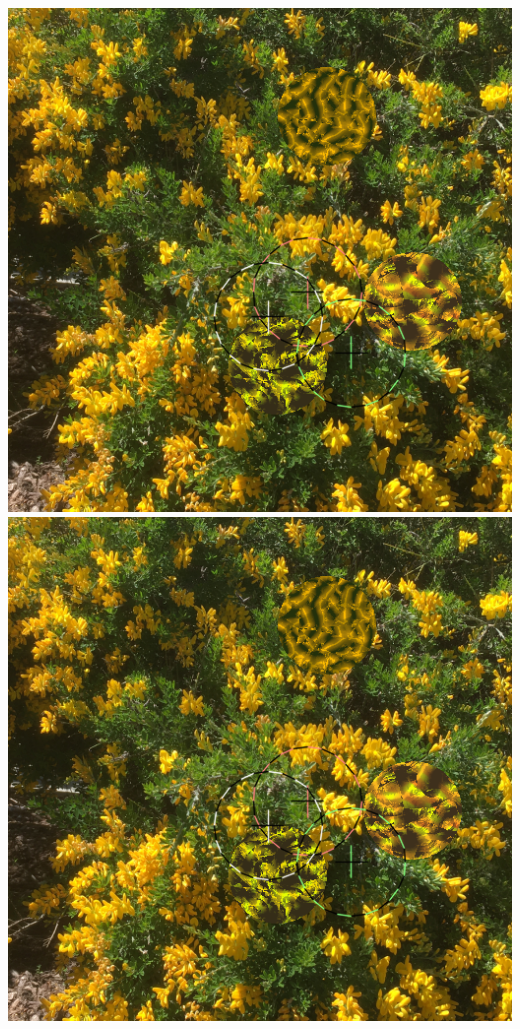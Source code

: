 \documentclass[sigconf]{acmart}
\begin{document}
\begin{teaserfigure}
    \includegraphics[scale=0.24]{20220930_step_6093}
    \hfill
    \includegraphics[scale=0.24]{20220930_step_6093}

\end{teaserfigure}
\end{document}
